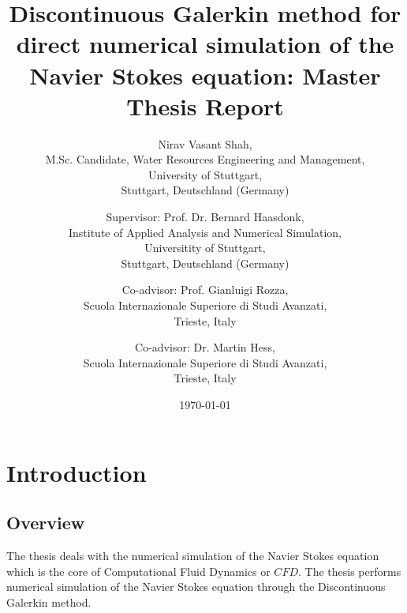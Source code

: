 \documentclass[a4paper,12pt]{book}
\begin{document}
\begin{center}

\title{Discontinuous Galerkin method for direct numerical simulation of the Navier Stokes equation: Master Thesis Report}


\author{Nirav Vasant Shah, \\M.Sc. Candidate, Water Resources Engineering and Management, \\University of Stuttgart, \\Stuttgart, Deutschland (Germany)\\ 
\and Supervisor: Prof. Dr. Bernard Haasdonk,\\ Institute of Applied Analysis and Numerical Simulation, \\Universitity of Stuttgart,\\ Stuttgart, Deutschland (Germany)\\ \and Co-advisor: Prof. Gianluigi Rozza,\\ Scuola Internazionale Superiore di Studi Avanzati, \\Trieste, Italy \\ \and Co-advisor: Dr. Martin Hess,\\ Scuola Internazionale Superiore di Studi Avanzati, \\Trieste, Italy }
\date{\today}
\maketitle

\end{center}

\tableofcontents

\newenvironment{spmatrix}[1]
 {\def\mysubscript{#1}\mathop\bgroup\begin{pmatrix}}
 {\end{pmatrix}\egroup_{\textstyle\mathstrut\mysubscript}}

\chapter{Introduction}

\section{Overview}

The thesis deals with the numerical simulation of the Navier Stokes equation which is the core of Computational Fluid Dynamics or $CFD$. The thesis performs numerical simulation of the Navier Stokes equation through the Discontinuous Galerkin method.
\end{document}
